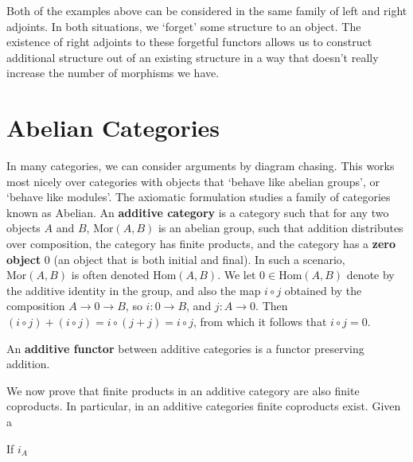 Both of the examples above can be considered in the same family of left and right adjoints. In both situations, we `forget' some structure to an object. The existence of right adjoints to these forgetful functors allows us to construct additional structure out of an existing structure in a way that doesn't really increase the number of morphisms we have.

\chapter{Abelian Categories}

In many categories, we can consider arguments by diagram chasing. This works most nicely over categories with objects that `behave like abelian groups', or `behave like modules'. The axiomatic formulation studies a family of categories known as Abelian. An {\bf additive category} is a category such that for any two objects $A$ and $B$, $\text{Mor}(A,B)$ is an abelian group, such that addition distributes over composition, the category has finite products, and the category has a {\bf zero object} $0$ (an object that is both initial and final). In such a scenario, $\text{Mor}(A,B)$ is often denoted $\text{Hom}(A,B)$. We let $0 \in \text{Hom}(A,B)$ denote by the additive identity in the group, and also the map $i \circ j$ obtained by the composition $A \to 0 \to B$, so $i: 0 \to B$, and $j: A \to 0$. Then $(i \circ j) + (i \circ j) = i \circ (j + j) = i \circ j$, from which it follows that $i \circ j = 0$.

An {\bf additive functor} between additive categories is a functor preserving addition.

We now prove that finite products in an additive category are also finite coproducts. In particular, in an additive categories finite coproducts exist. Given a 

\begin{lemma}
    If $i_A$
\end{lemma}


